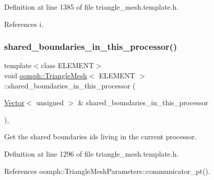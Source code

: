 Definition at line 1385 of file triangle\+\_\+mesh.\+template.\+h.



References i.

\mbox{\label{classoomph_1_1TriangleMesh_a3fa21c284395e87058afd244e3f04155}} 
\subsubsection{\texorpdfstring{shared\+\_\+boundaries\+\_\+in\+\_\+this\+\_\+processor()}{shared\_boundaries\_in\_this\_processor()}}
{\footnotesize\ttfamily template$<$class E\+L\+E\+M\+E\+NT$>$ \\
void \hyperlink{classoomph_1_1TriangleMesh}{oomph\+::\+Triangle\+Mesh}$<$ E\+L\+E\+M\+E\+NT $>$\+::shared\+\_\+boundaries\+\_\+in\+\_\+this\+\_\+processor (\begin{DoxyParamCaption}\item[{\hyperlink{classoomph_1_1Vector}{Vector}$<$ unsigned $>$ \&}]{shared\+\_\+boundaries\+\_\+in\+\_\+this\+\_\+processor }\end{DoxyParamCaption})\hspace{0.3cm}{\ttfamily [inline]}, {\ttfamily [protected]}}



Get the shared boundaries ids living in the current processor. 



Definition at line 1296 of file triangle\+\_\+mesh.\+template.\+h.



References oomph\+::\+Triangle\+Mesh\+Parameters\+::communicator\+\_\+pt().

\mbox{\label{classoomph_1_1TriangleMesh_ae839e9de828d756a894a482911664f14}} 
